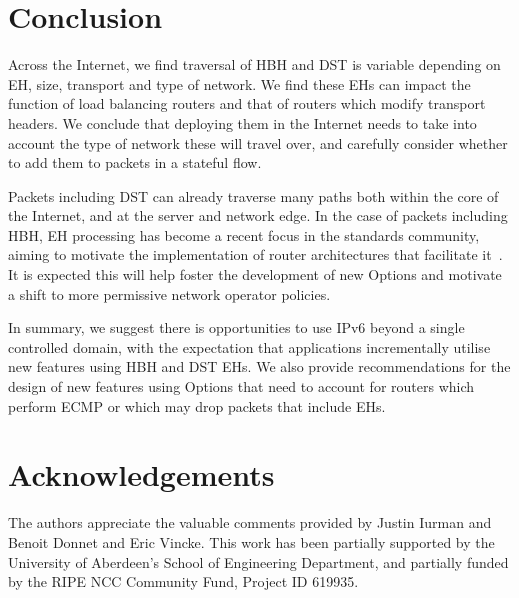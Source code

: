 \documentclass[conference]{IEEEtran}
\begin{document}
\section{Conclusion}
\label{sec:conclusion}

Across the Internet, we find traversal of HBH and DST is variable depending on EH, size, transport and type of network. We find these EHs can impact the function of load balancing routers and that of routers which modify transport headers. We conclude that deploying them in the Internet needs to take into account the type of network these will travel over, and carefully consider whether to add them to packets in a stateful flow.

Packets including DST can already traverse many paths both within the core of the Internet, and at the server and network edge. In the case of packets including HBH, 
EH processing has become a recent focus in the standards community, aiming to motivate the implementation of router architectures that facilitate it~\cite{ietf-6man-HBH-processing-06, ietf-v6ops-hbh-03, ietf-6man-eh-limits-02}. 
It is expected this will help foster the development of new Options and motivate a shift to more permissive network operator policies.

In summary, we suggest there is opportunities to use IPv6 beyond a single controlled domain, with the expectation that applications incrementally utilise new features using HBH and DST EHs. We also provide recommendations for the design of new features using Options that need to account for routers which perform ECMP or which may drop packets that include EHs.

\section*{Acknowledgements}

The authors appreciate the valuable comments provided by Justin Iurman and Benoit Donnet and Eric Vincke. This work has been partially supported by the University of Aberdeen's School of Engineering Department, and partially funded by the RIPE
NCC Community Fund, Project ID 619935.


\small

\end{document}
